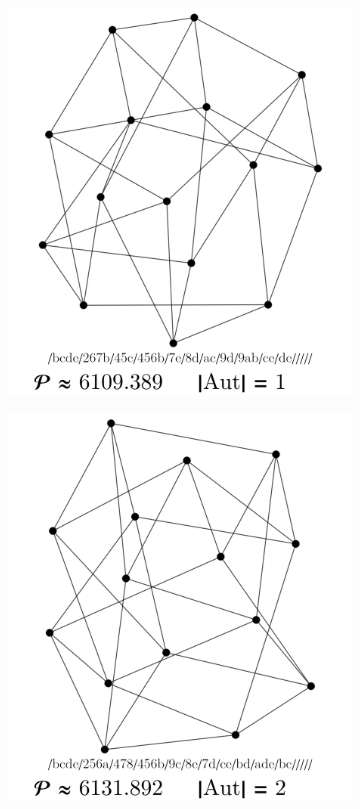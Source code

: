 \documentclass[11pt,a4paper]{article}
\renewcommand{\|}{\rule[-0.4ex]{0.2ex}{1.2em}}
\begin{document}
\begin{figure}[htb]
\begin{subfigure}[b]{.24 \textwidth}
		\subcaption{}
	\end{subfigure}
	\begin{subfigure}[b]{.24 \textwidth}
		\includegraphics[width=\linewidth]{smallest_13_3}
		\subcaption{}
	\end{subfigure}
	\begin{subfigure}[b]{.24 \textwidth}
		\includegraphics[width=\linewidth]{smallest_13_4}
		\subcaption{}
	\end{subfigure}
	

\end{figure}
\end{document}
